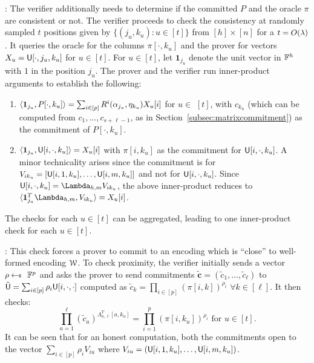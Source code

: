 : The verifier additionally needs to determine if the committed $P$ and the oracle $\pi$ are consistent or not. The verifier proceeds to check the consistency at randomly sampled $t$ positions given by $\{(j_u,k_u): u\in [t]\}$ from $[h] \times [n]$ for a $t=O(\secpar)$. It queries the oracle for the columns $\pi[\cdot,k_u]$ and the prover for vectors $X_u = \ewit[\cdot,j_u,k_u]$ for $u\in [t]$.  For $u\in [t]$, let
$\bm{1}_{j_u}$ denote the unit vector in $\FF^h$ with $1$ in the position $j_u$. The prover and the verifier run inner-product arguments to establish the following:
\begin{enumerate}[{\rm 1.}]
	\item $\innp{\bm{1}_{j_u}}{P[\cdot,k_u]}= \sum_{i \in [p]} R^i(\alpha_{j_u},\eta_{k_u}) X_u[i]$  for $u\in$ $[t]$, with $c_{k_u}$ (which can be computed from $c_1,\ldots,c_{s+\ell-1}$, as in Section~\ref{subsec:matrixcommitment})  as the commitment of  $P[\cdot,k_u]$. 
	\item $\innp{\bm{1}_{j_u}}{\ewit[i,\cdot,k_u]} = X_u[i]$ with $\pi[i,k_u]$ as the commitment for $\ewit[i,\cdot,k_u]$. A minor technicality arises since the commitment is for $V_{ik_u} = [\ewit[i,1,k_u], \ldots, \ewit[i,m,k_u]]$ and not for  $\ewit[i,\cdot,k_u]$. Since $\ewit[i,\cdot,k_u] = \Lambda_{h,m}V_{ik_u}$,  the above inner-product reduces to 
	$ \innp{\bm{1}^T_{j_u}\Lambda_{h,m}}{ V_{ik_u}} = X_u[i]$. 	
\end{enumerate}
The checks for each $u\in [t]$ can be aggregated, leading to one inner-product check for each $u\in [t]$.

\smallskip

: This check forces a prover to commit to an encoding which is ``close'' to well-formed encoding $\mc{W}$. To check proximity, the verifier initially  sends a vector $\rho\sample \FF^p$ and asks the prover to send commitments $\tilde{\bm{c}} = (\tilde{c}_1,\ldots,\tilde{c}_\ell)$ to $\tilde{\ewit}=\sum_{i\in 	[p]}\rho_i\ewit[i,\cdot,\cdot]$ computed as $\tilde{c}_k = \prod_{i\in[p]}(\pi[i,k])^{\rho_i}$ $\forall k\in[\ell]$. It then checks:
\begin{equation}\label{eq:proxchecks}
\prod_{a=1}^\ell(\tilde{c}_a)^{\Lambda^T_{n,\ell}[a,k_u]}=\prod_{i=1}^p(\pi[i,k_u])^{\rho_i} \text{ for } u\in [t].
\end{equation} 
It can be seen that for an honest computation, both the commitments open to the vector $\sum_{i\in [p]}\rho_iV_{iu}$ where $V_{iu}=(\ewit[i,1,k_u],\ldots,\ewit[i,m,k_u])$.

